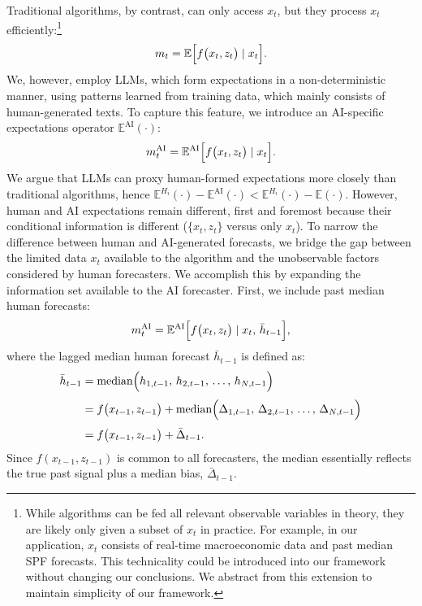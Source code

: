 \documentclass[11pt,letterpaper]{scrartcl}
\begin{document}
Traditional algorithms, by contrast, can only access \(x_t\), but they process \(x_t\) efficiently:\footnote{While algorithms can be fed all relevant observable variables in theory, they are likely only given a subset of \(x_t\) in practice. For example, in our application, \(x_t\) consists of real-time macroeconomic data and past median SPF forecasts. This technicality could be introduced into our framework without changing our conclusions. We abstract from this extension to maintain simplicity of our framework.}  
\begin{align}\label{eq:machine_forecasting}
    m_t = \mathbb{E}\Bigl[f\bigl(x_t, z_t\bigr) \mid x_t\Bigr].
\end{align} 
We, however, employ LLMs, which form expectations in a non-deterministic manner, using patterns learned from training data, which mainly consists of human-generated texts. To capture this feature, we introduce an AI-specific expectations operator \(\mathbb{E}^{\text{AI}}(\cdot)\):
\begin{align}
    m_t^{\text{AI}} = \mathbb{E}^{\text{AI}}\Bigl[f\bigl(x_t, z_t\bigr) \mid x_t\Bigr].
\end{align}    
We argue that LLMs can proxy human-formed expectations more closely than traditional algorithms, hence $\mathbb{E}^{H_i}(\cdot)-\mathbb{E}^\text{AI}(\cdot)<\mathbb{E}^{H_i}(\cdot)-\mathbb{E}(\cdot)$. However, human and AI expectations remain different, first and foremost because their conditional information is different ($\{x_t,z_t\}$ versus only $x_t$). To narrow the difference between human and AI-generated forecasts, we bridge the gap between the limited data \(x_t\) available to the algorithm and the unobservable factors considered by human forecasters. We accomplish this by expanding the information set available to the AI forecaster. First, we include past median human forecasts:
\begin{align}
    m_t^{\text{AI}} = \mathbb{E}^{\text{AI}}\Bigl[f\bigl(x_t, z_t\bigr) \mid x_t, \, \bar{h}_{t-1}\Bigr],
\end{align}
where the lagged median human forecast \(\bar{h}_{t-1}\) is defined as:
\begin{align}
    \bar{h}_{t-1} &= \text{median}\Bigl(h_{1,t-1},\, h_{2,t-1},\, \dots,\, h_{N,t-1}\Bigr) \nonumber\\[1mm]
    &= f\bigl(x_{t-1}, z_{t-1}\bigr) + \text{median}\Bigl(\Delta_{1,t-1},\, \Delta_{2,t-1},\, \dots,\, \Delta_{N,t-1}\Bigr) \nonumber\\[1mm]
    &= f\bigl(x_{t-1}, z_{t-1}\bigr) + \bar{\Delta}_{t-1}.
\end{align}
Since \(f(x_{t-1},z_{t-1})\) is common to all forecasters, the median essentially reflects the true past signal plus a median bias, \(\bar{\Delta}_{t-1}\). 
\end{document}
